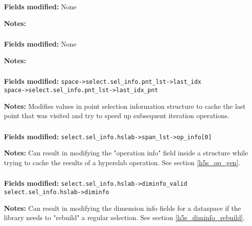 \documentclass[../HDF5_RFC.tex]{subfiles}
\begin{document}
\textbf{Fields modified:} None

\textbf{Notes:}

\subsubsection{}

\textbf{Fields modified:} None

\textbf{Notes:}

\subsubsection{}

\textbf{Fields modified:} \texttt{space->select.sel\_info.pnt\_lst->last\_idx} \\
\texttt{space->select.sel\_info.pnt\_lst->last\_idx\_pnt}

\textbf{Notes:} Modifies values in point selection information structure to cache the last point that
was visited and try to speed up subsequent iteration operations.

\subsubsection{}

\textbf{Fields modified:} \texttt{select.sel\_info.hslab->span\_lst->op\_info[0]}

\textbf{Notes:} Can result in modifying the "operation info" field inside a structure while trying to
cache the results of a hyperslab operation. See section \ref{h5s_op_gen}.

\subsubsection{}

\textbf{Fields modified:} \texttt{select.sel\_info.hslab->diminfo\_valid} \\
\texttt{select.sel\_info.hslab->diminfo}

\textbf{Notes:} Can result in modifying the dimension info fields for a dataspace if the library needs
to "rebuild" a regular selection. See section \ref{h5s_diminfo_rebuild}.

\subsubsection{}
\end{document}
